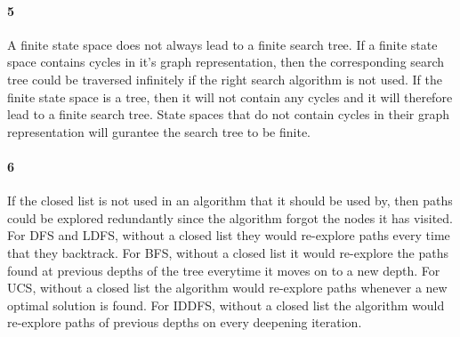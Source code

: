 \documentclass[12pt]{article}
\begin{document}
\paragraph{5}
A finite state space does not always lead to a finite search tree. If a finite state space contains cycles in it's graph representation, then the corresponding search tree could be traversed infinitely if the right search algorithm is not used. If the finite state space is a tree, then it will not contain any cycles and it will therefore lead to a finite search tree. State spaces that do not contain cycles in their graph representation will gurantee the search tree to be finite.
\paragraph{6}
If the closed list is not used in an algorithm that it should be used by, then paths could be explored redundantly since the algorithm forgot the nodes it has visited. For DFS and LDFS, without a closed list they would re-explore paths every time that they backtrack. For BFS, without a closed list it would re-explore the paths found at previous depths of the tree everytime it moves on to a new depth. For UCS, without a closed list the algorithm would re-explore paths whenever a new optimal solution is found. For IDDFS, without a closed list the algorithm would re-explore paths of previous depths on every deepening iteration.
\end{document}
